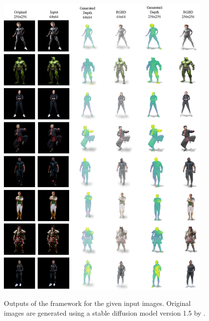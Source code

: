 \begin{figure}[t]
  \centering
  \caption{Outputs of the \modelname{} framework for the given input images. Original images are generated using a stable diffusion model version 1.5 by \cite{rombach_high-resolution_2022}.}
  \includegraphics[width=0.95\textwidth]{illustrations/appendix_rgbd3.png}
  \label{fig:rgb_d_fusion_wild_rgbd_3}
\end{figure}